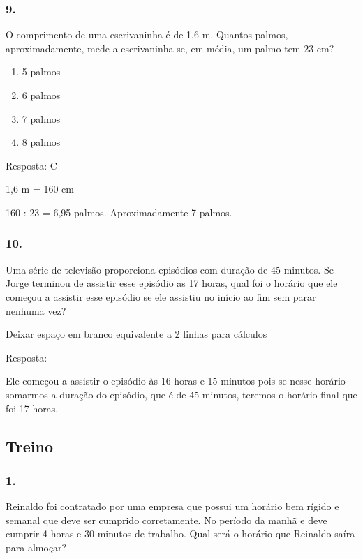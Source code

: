 \subsubsection{9.}\label{section-59}

O comprimento de uma escrivaninha é de 1,6 m. Quantos palmos,
aproximadamente, mede a escrivaninha se, em média, um palmo tem 23 cm?

\begin{enumerate}
\def\labelenumi{\alph{enumi})}
\item
  5 palmos
\item
  6 palmos
\item
  7 palmos
\item
  8 palmos
\end{enumerate}

Resposta: C

1,6 m = 160 cm

160 : 23 = 6,95 palmos. Aproximadamente 7 palmos.

\subsubsection{10.}\label{section-60}

Uma série de televisão proporciona episódios com duração de 45 minutos.
Se Jorge terminou de assistir esse episódio as 17 horas, qual foi o
horário que ele começou a assistir esse episódio se ele assistiu no
início ao fim sem parar nenhuma vez?

Deixar espaço em branco equivalente a 2 linhas para cálculos

Resposta:

Ele começou a assistir o episódio às 16 horas e 15 minutos pois se nesse
horário somarmos a duração do episódio, que é de 45 minutos, teremos o
horário final que foi 17 horas.

\subsection{Treino}\label{treino-3}

\subsubsection{1.}\label{section-61}

Reinaldo foi contratado por uma empresa que possui um horário bem rígido
e semanal que deve ser cumprido corretamente. No período da manhã e deve
cumprir 4 horas e 30 minutos de trabalho. Qual será o horário que
Reinaldo saíra para almoçar?


